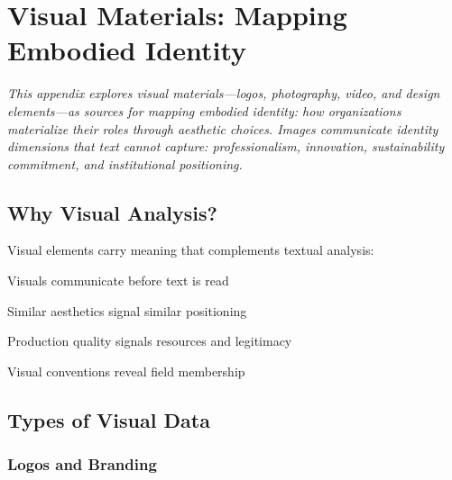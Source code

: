 \chapter{Visual Materials: Mapping Embodied Identity}
\label{app:visual-materials}

\noindent\textit{This appendix explores visual materials---logos, photography, video, and design elements---as sources for mapping embodied identity: how organizations materialize their roles through aesthetic choices. Images communicate identity dimensions that text cannot capture: professionalism, innovation, sustainability commitment, and institutional positioning.}

\bigskip


\section*{Why Visual Analysis?}

Visual elements carry meaning that complements textual analysis:


\begin{description}[leftmargin=0.5cm, itemsep=0.3em]
\item[Immediate Impression] Visuals communicate before text is read
\item[Identity Clustering] Similar aesthetics signal similar positioning
\item[Professionalism Markers] Production quality signals resources and legitimacy
\item[Sector Alignment] Visual conventions reveal field membership
\end{description}


\section*{Types of Visual Data}

\subsection*{Logos and Branding}


